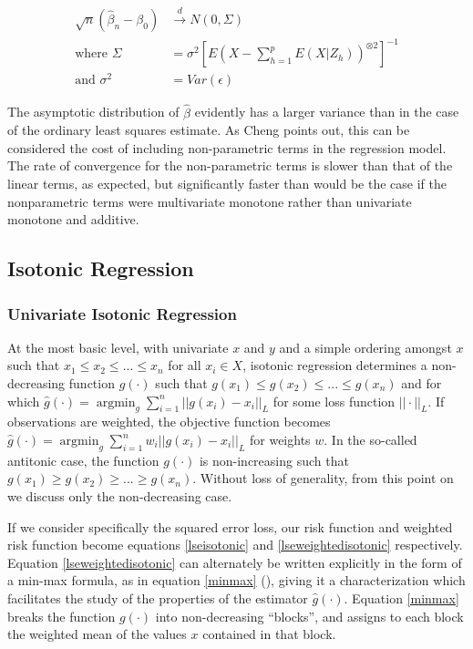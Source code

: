 \documentclass[10pt]{olplainarticle}\usepackage[]{graphicx}\usepackage[]{color}
\DeclareMathOperator*{\argmin}{argmin}
\begin{document}
\begin{equation} \label{asymbeta}
\begin{aligned}
  \sqrt{n}(\hat{\beta}_n - \beta_0) &\xrightarrow{d} N(0, \Sigma) \\
  \text{where } \Sigma &= \sigma^2[E(X - \sum_{h=1}^{p}E(X|Z_h))^{\otimes 2}]^{-1} \\
  \text{and } \sigma^2 &= Var(\epsilon)
\end{aligned}
\end{equation}

The asymptotic distribution of $\hat{\beta}$ evidently has a larger variance than in the case of the ordinary least squares estimate. As Cheng points out, this can be considered the cost of including non-parametric terms in the regression model. The rate of convergence for the non-parametric terms is slower than that of the linear terms, as expected, but significantly faster than would be the case if the nonparametric terms were multivariate monotone rather than univariate monotone and additive.


\subsection{Isotonic Regression}

\subsubsection{Univariate Isotonic Regression}
At the most basic level, with univariate $x$ and $y$ and a simple ordering amongst $x$ such that \( x_{1} \leq x_{2} \leq ... \leq x_{n} \) for all \( x_{i} \in X \), isotonic regression determines a non-decreasing function $g(\cdot)$ such that \( g(x_{1}) \leq g(x_{2}) \leq ... \leq g(x_{n}) \) and for which \( \hat{g}(\cdot) = \argmin_{g} \sum_{i=1}^{n}||g(x_{i}) - x_{i}||_{L} \) for some loss function $||\cdot||_{L}$. If observations are weighted, the objective function becomes \( \hat{g}(\cdot) = \argmin_{g} \sum_{i=1}^{n}w_{i}||g(x_{i}) - x_{i}||_{L} \) for weights $w$. In the so-called antitonic case, the function $g(\cdot)$ is non-increasing such that \( g(x_{1}) \geq g(x_{2}) \geq ... \geq g(x_{n}) \). Without loss of generality, from this point on we discuss only the non-decreasing case.

If we consider specifically the squared error loss, our risk function and weighted risk function become equations \ref{lseisotonic} and \ref{lseweightedisotonic} respectively. Equation \ref{lseweightedisotonic} can alternately be written explicitly in the form of a min-max formula, as in equation \ref{minmax} (\cite{jordan}), giving it a characterization which facilitates the study of the properties of the estimator $\hat{g}(\cdot)$. Equation \ref{minmax} breaks the function $g(\cdot)$ into non-decreasing ``blocks'', and assigns to each block the weighted mean of the values $x$ contained in that block.
\end{document}
